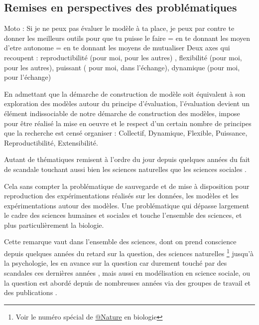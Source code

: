 \subsection{Remises en perspectives des problématiques}

Moto : Si je ne peux pas évaluer le modèle à ta place, je peux par contre te donner les meilleurs outils pour que tu puisse le faire 
= en te donnant les moyen d'etre autonome
= en te donnant les moyens de mutualiser
Deux axes qui recoupent : reproductibilité (pour moi, pour les autres) , flexibilité (pour moi, pour les autres), puissant ( pour moi, dans l'échange), dynamique (pour moi, pour l'échange)

En admettant que la démarche de construction de modèle soit équivalent à son exploration des modèles autour du principe d'évaluation, l'évaluation devient un élément indissociable de notre démarche de construction des modèles, impose pour être réalisé la mise en oeuvre et le respect d'un certain nombre de principes que la recherche est censé organiser : Collectif, Dynamique, Flexible, Puissance, Reproductibilité, Extensibilité. 

Autant de thématiques remisent à l'ordre du jour depuis quelques années du fait de scandale touchant aussi bien les sciences naturelles que les sciences sociales \autocite{OpenScience2012}. 

Cela sans compter la problématique de sauvegarde \autocite{Vines2013} \autocite{Turner2013} et de mise à disposition pour reproduction des expérimentations réalisés sur les données, les modèles et les expérimentations autour des modèles. Une problématique qui dépasse largement le cadre des sciences humaines et sociales et touche l'ensemble des sciences, et plus particulièrement la biologie. 

Cette remarque vaut dans l'ensemble des sciences, dont on prend conscience depuis quelques années du retard sur la question, des sciences naturelles \footnote{Voir le numéro spécial de \href{http://www.nature.com/nature/focus/reproducibility/index.html}{@Nature} en biologie} jusqu'à la psychologie, les  en avance sur la question car durement touché par des scandales ces dernières années \autocite{Steen2011}, mais aussi en modélisation en science sociale, ou la question est abordé depuis de nombreuses années via des groupes de travail et des publications \autocite{Hales2003} \autocite{Rouchier2013}.

